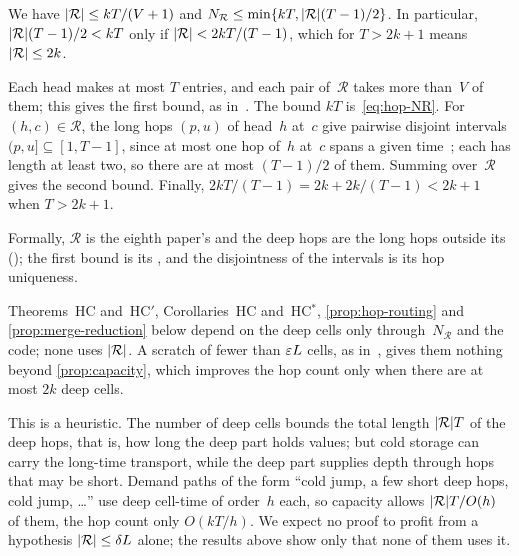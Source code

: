 \begin{proposition}\label{prop:capacity}
We have $\lvert \mathcal R \rvert\le kT/(V+1)$ and $N_{\mathcal R}\le\min\{kT,\lvert \mathcal R \rvert(T-1)/2\}$. In particular,
$\lvert \mathcal R \rvert(T-1)/2<kT$ only if $\lvert \mathcal R \rvert<2kT/(T-1)$, which for $T>2k+1$ means $\lvert \mathcal R \rvert\le2k$.
\end{proposition}

\begin{outline}
Each head makes at most $T$ entries, and each pair of~$\mathcal R$ takes more than~$V$ of them; this gives the first
bound, as in~\cite[Section~2.2]{BoundedNesting2026}. The bound $kT$ is~\eqref{eq:hop-NR}. For $(h,c)\in\mathcal R$, the
long hops $(p,u)$ of head~$h$ at~$c$ give pairwise disjoint intervals $(p,u]\subseteq[1,T-1]$, since at most one hop
of~$h$ at~$c$ spans a given time~\cite[Section~2.2, (P1)]{BoundedNesting2026}; each has length at least two, so there
are at most $(T-1)/2$ of them. Summing over~$\mathcal R$ gives the second bound. Finally,
$2kT/(T-1)=2k+2k/(T-1)<2k+1$ when $T>2k+1$.

Formally, $\mathcal R$ is the eighth paper's  and the deep hops are the long hops outside
its  (); the first bound is its
, and the disjointness of the intervals is its hop uniqueness.
\end{outline}

Theorems~HC and~HC$'$, Corollaries~HC and~HC$^*$, \cref{prop:hop-routing} and \cref{prop:merge-reduction} below depend on
the deep cells only through~$N_{\mathcal R}$ and the code; none uses $\lvert \mathcal R \rvert$. A scratch of fewer than $\varepsilon L$
cells, as in~\cite[Problem~10.5]{BoundedNesting2026}, gives them nothing beyond \cref{prop:capacity}, which improves the
hop count only when there are at most $2k$ deep cells.

\begin{remark}\label{rem:capacity-heuristic}
This is a heuristic. The number of deep cells bounds the total length $\lvert \mathcal R \rvert T$ of the deep hops, that is, how
long the deep part holds values; but cold storage can carry the long-time transport, while the deep part supplies depth
through hops that may be short. Demand paths of the form ``cold jump, a few short deep hops, cold jump, \dots'' use deep
cell-time of order~$h$ each, so capacity allows $\lvert \mathcal R \rvert T/O(h)$ of them, the hop count only $O(kT/h)$. We
expect no proof to profit from a hypothesis $\lvert \mathcal R \rvert\le\delta L$ alone; the results above show only that none
of them uses it.
\end{remark}

